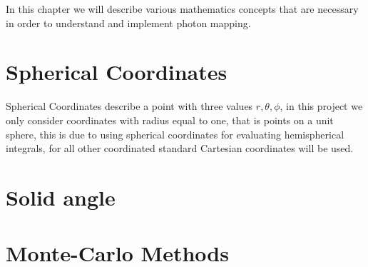 In this chapter we will describe various mathematics concepts that are necessary in order to understand and implement photon mapping.

\section{Spherical Coordinates}
Spherical Coordinates describe a point with three values $r, \theta, \phi$, in this project we only consider coordinates with
radius equal to one, that is points on a unit sphere, this is due to using spherical coordinates for evaluating hemispherical
integrals, for all other coordinated standard Cartesian coordinates will be used.


\section{Solid angle}



\section{Monte-Carlo Methods}

